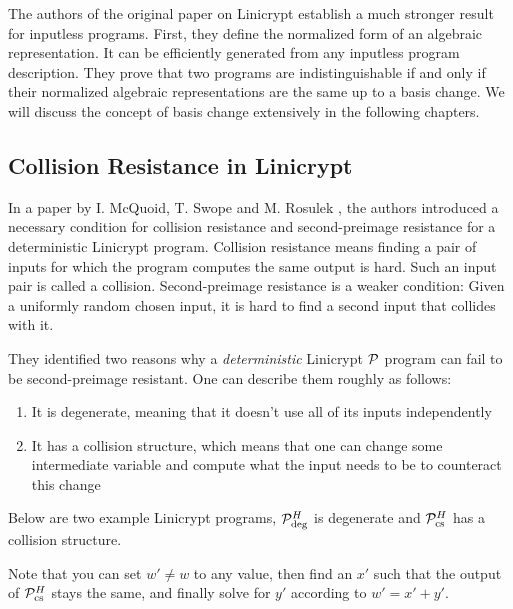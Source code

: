 The authors of the original paper on Linicrypt \cite{C:CarRos16} establish a much stronger result for inputless programs.
First, they define the normalized form of an algebraic representation.
It can be efficiently generated from any inputless program description.
They prove that two programs are indistinguishable if and only if their normalized algebraic representations are the same up to a basis change.
We will discuss the concept of basis change extensively in the following chapters.

\subsection{Collision Resistance in Linicrypt}

In a paper by I. McQuoid, T. Swope and M. Rosulek
\cite[Characterizing Collision and Second-Preimage Resistance in Linicrypt]{TCC:McQSwoRos19},
the authors introduced a necessary condition for collision resistance
and second-preimage resistance for a deterministic Linicrypt program.
Collision resistance means finding a pair of inputs for which the program computes the same output is hard.
Such an input pair is called a collision.
Second-preimage resistance is a weaker condition:
Given a uniformly random chosen input,
it is hard to find a second input that collides with it. 

They identified two reasons why a \textit{deterministic} Linicrypt $\P$ program can fail to be second-preimage resistant.
One can describe them roughly as follows:
\begin{enumerate}
  \item It is degenerate, meaning that it doesn't use all of its inputs independently
  \item It has a collision structure,
    which means that one can change some intermediate variable and compute what the input needs to be to counteract this change
\end{enumerate}

Below are two example Linicrypt programs, $\P^\H_\textrm{deg}$ is degenerate and $\P^\H_\textrm{cs}$ has a collision structure.
\begin{pchstack}[center,space=2cm]
\end{pchstack}
Note that you can set $w' \neq w$ to any value,
then find an $x'$ such that the output of $\P^\H_{\textrm{cs}}$ stays the same,
and finally solve for $y'$ according to $w' = x' + y'$.

